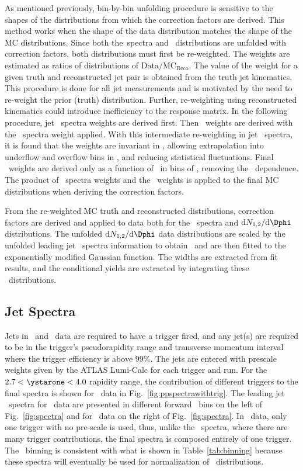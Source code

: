 As mentioned previously, bin-by-bin unfolding procedure is sensitive to the shapes of the distributions from which the correction factors are derived. This method works when the shape of the data distribution matches the shape of the MC distributions. Since both the\pt\ spectra and \conetwo\ distributions are unfolded with correction factors, both distributions must first be re-weighted. The weights are estimated as ratios of distributions of $\mathrm{Data/MC_{Reco}}$. The value of the weight for a given truth and reconstructed jet pair is obtained from the truth jet kinematics. This procedure is done for all jet measurements and is motivated by the need to re-weight the prior (truth) distribution. Further, re-weighting using reconstructed kinematics could introduce inefficiency to the response matrix. In the following procedure, jet \pt\ spectra weights are derived first. Then \conetwo\ weights are derived with the \pt\ spectra weight applied. With this intermediate re-weighting in jet \pt\ spectra, it is found that the \conetwo weights are invariant in \pT, allowing extrapolation into underflow and overflow bins in \pT, and reducing statistical fluctuations. Final \conetwo\ weights are derived only as a function of \Dphi\ in bins of \ystar, removing the \pT\ dependence. The product of \pt\ spectra weights and the \conetwo\ weights is applied to the final MC distributions when deriving the correction factors.

From the re-weighted MC truth and reconstructed distributions, correction factors are derived and applied to data both for the \pt\ spectra and $\mathrm{d}N_{1,2}/\mathrm{d}\Dphi$ distributions. The unfolded $\mathrm{d}N_{1,2}/\mathrm{d}\Dphi$  data distributions are scaled by the unfolded leading jet \pt\ spectra information to obtain \conetwo\ and are then fitted to the exponentially modified Gaussian function. The widths are extracted from fit results, and the conditional yields are extracted by integrating these \conetwo\ distributions.

\subsection{Jet Spectra}

Jets in \pp\ and \pPb\ data are required to have a trigger fired, and any jet(s) are required to be in the trigger's pseudorapidity range and transverse momentum interval where the trigger efficiency is above $99\%$. The jets are entered with prescale weights given by the ATLAS Lumi-Calc for each trigger and run. For the $2.7<\ystarone<4.0$ rapidity range, the contribution of different triggers to the final spectra is shown for \pp\ data in Fig.~\ref{fig:ppspectrawithtrig}. The leading jet \pt\ spectra for \pp\ data are presented in different forward \ystar\ bins on the left of Fig.~\ref{fig:spectra} and for \pPb\ data on the right of Fig.~\ref{fig:spectra}. In \pPb\ data, only one trigger with no pre-scale is used, thus, unlike the \pp\ spectra, where there are many trigger contributions, the final spectra is composed entirely of one trigger. The \pT\ binning is consistent with what is shown in Table~\ref{tab:binning} because these spectra will eventually be used for normalization of \Dphi\ distributions.


